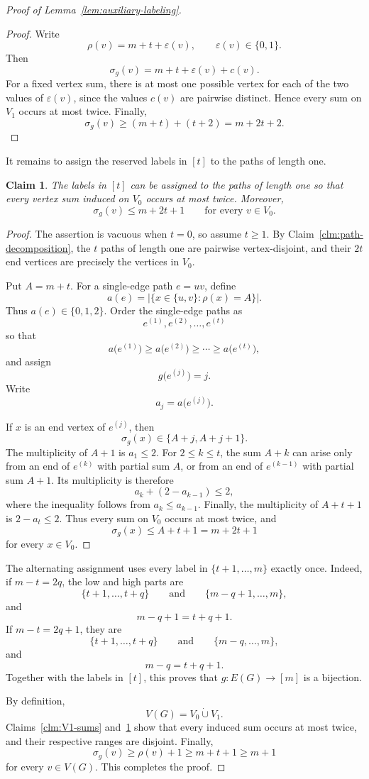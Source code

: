 \documentclass[preprint,12pt]{elsarticle}
\newtheorem{claim}{Claim}[section]
\begin{document}
\begin{proof}[Proof of Lemma~\ref{lem:auxiliary-labeling}]
\begin{proof}
Write
\[
\rho(v)=m+t+\varepsilon(v),
\qquad
\varepsilon(v)\in\{0,1\}.
\]
Then
\[
\sigma_g(v)=m+t+\varepsilon(v)+c(v).
\]
For a fixed vertex sum, there is at most one possible vertex for each of
the two values of \(\varepsilon(v)\), since the values \(c(v)\) are
pairwise distinct. Hence every sum on \(V_1\) occurs at most twice.
Finally,
\[
\sigma_g(v)\ge(m+t)+(t+2)=m+2t+2.
\]
\end{proof}

It remains to assign the reserved labels in \([t]\) to the paths of
length one.

\begin{claim}
\label{clm:V0-sums}
The labels in \([t]\) can be assigned to the paths of length one so that
every vertex sum induced on \(V_0\) occurs at most twice. Moreover,
\[
\sigma_g(v)\le m+2t+1
\qquad\text{for every }v\in V_0.
\]
\end{claim}

\begin{proof}
The assertion is vacuous when \(t=0\), so assume \(t\ge1\). By
Claim~\ref{clm:path-decomposition}, the \(t\) paths of length one are
pairwise vertex-disjoint, and their \(2t\) end vertices are precisely the
vertices in \(V_0\).

Put \(A=m+t\). For a single-edge path \(e=uv\), define
\[
a(e)
=
\left|
\{x\in\{u,v\}:\rho(x)=A\}
\right|.
\]
Thus \(a(e)\in\{0,1,2\}\). Order the single-edge paths as
\[
e^{(1)},e^{(2)},\ldots,e^{(t)}
\]
so that
\[
a\bigl(e^{(1)}\bigr)
\ge
a\bigl(e^{(2)}\bigr)
\ge\cdots\ge
a\bigl(e^{(t)}\bigr),
\]
and assign
\[
g\bigl(e^{(j)}\bigr)=j.
\]
Write
\[
a_j=a\bigl(e^{(j)}\bigr).
\]

If \(x\) is an end vertex of \(e^{(j)}\), then
\[
\sigma_g(x)\in\{A+j,A+j+1\}.
\]
The multiplicity of \(A+1\) is \(a_1\le2\). For \(2\le k\le t\), the sum
\(A+k\) can arise only from an end of \(e^{(k)}\) with partial sum \(A\),
or from an end of \(e^{(k-1)}\) with partial sum \(A+1\). Its
multiplicity is therefore
\[
a_k+(2-a_{k-1})\le2,
\]
where the inequality follows from \(a_k\le a_{k-1}\). Finally, the
multiplicity of \(A+t+1\) is \(2-a_t\le2\). Thus every sum on \(V_0\)
occurs at most twice, and
\[
\sigma_g(x)\le A+t+1=m+2t+1
\]
for every \(x\in V_0\).
\end{proof}

The alternating assignment uses every label in
\(\{t+1,\ldots,m\}\) exactly once. Indeed, if \(m-t=2q\), the low and
high parts are
\[
\{t+1,\ldots,t+q\}
\qquad\text{and}\qquad
\{m-q+1,\ldots,m\},
\]
and
\[
m-q+1=t+q+1.
\]
If \(m-t=2q+1\), they are
\[
\{t+1,\ldots,t+q\}
\qquad\text{and}\qquad
\{m-q,\ldots,m\},
\]
and
\[
m-q=t+q+1.
\]
Together with the labels in \([t]\), this proves that
\(g:E(G)\to[m]\) is a bijection.

By definition,
\[
V(G)=V_0\mathbin{\dot\cup}V_1.
\]
Claims~\ref{clm:V1-sums} and~\ref{clm:V0-sums} show that every induced
sum occurs at most twice, and their respective ranges are disjoint.
Finally,
\[
\sigma_g(v)\ge\rho(v)+1\ge m+t+1\ge m+1
\]
for every \(v\in V(G)\). This completes the proof.
\end{proof}
\end{document}
